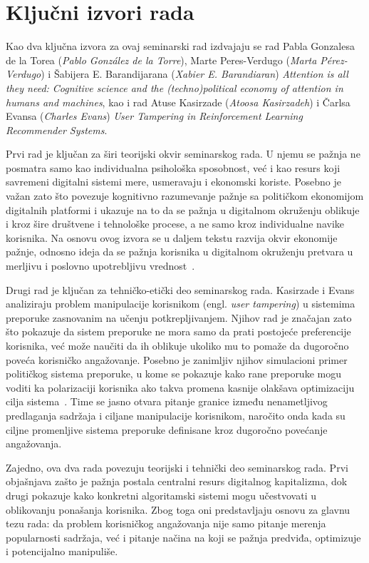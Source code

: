 \section{Ključni izvori rada}

Kao dva ključna izvora za ovaj seminarski rad izdvajaju se rad Pabla Gonzalesa de la Torea (\textit{Pablo González de la Torre}), Marte Peres-Verdugo (\textit{Marta Pérez-Verdugo}) i Šabijera E. Barandijarana (\textit{Xabier E. Barandiaran}) \textit{Attention is all they need: Cognitive science and the (techno)political economy of attention in humans and machines}, kao i rad Atuse Kasirzade (\textit{Atoosa Kasirzadeh}) i Čarlsa Evansa (\textit{Charles Evans}) \textit{User Tampering in Reinforcement Learning Recommender Systems}.

Prvi rad je ključan za širi teorijski okvir seminarskog rada. U njemu se pažnja ne posmatra samo kao individualna psihološka sposobnost, već i kao resurs koji savremeni digitalni sistemi mere, usmeravaju i ekonomski koriste. Posebno je važan zato što povezuje kognitivno razumevanje pažnje sa političkom ekonomijom digitalnih platformi i ukazuje na to da se pažnja u digitalnom okruženju oblikuje i kroz šire društvene i tehnološke procese, a ne samo kroz individualne navike korisnika. Na osnovu ovog izvora se u daljem tekstu razvija okvir ekonomije pažnje, odnosno ideja da se pažnja korisnika u digitalnom okruženju pretvara u merljivu i poslovno upotrebljivu vrednost~\cite{gonzalez2024attention}.

Drugi rad je ključan za tehničko-etički deo seminarskog rada. Kasirzade i Evans analiziraju problem manipulacije korisnikom (engl. \textit{user tampering}) u sistemima preporuke zasnovanim na učenju potkrepljivanjem. Njihov rad je značajan zato što pokazuje da sistem preporuke ne mora samo da prati postojeće preferencije korisnika, već može naučiti da ih oblikuje ukoliko mu to pomaže da dugoročno poveća korisničko angažovanje. Posebno je zanimljiv njihov simulacioni primer političkog sistema preporuke, u kome se pokazuje kako rane preporuke mogu voditi ka polarizaciji korisnika ako takva promena kasnije olakšava optimizaciju cilja sistema~\cite{kasirzadeh2021user}. Time se jasno otvara pitanje granice između nenametljivog predlaganja sadržaja i ciljane manipulacije korisnikom, naročito onda kada su ciljne promenljive sistema preporuke definisane kroz dugoročno povećanje angažovanja.

Zajedno, ova dva rada povezuju teorijski i tehnički deo seminarskog rada. Prvi objašnjava zašto je pažnja postala centralni resurs digitalnog kapitalizma, dok drugi pokazuje kako konkretni algoritamski sistemi mogu učestvovati u oblikovanju ponašanja korisnika. Zbog toga oni predstavljaju osnovu za glavnu tezu rada: da problem korisničkog angažovanja nije samo pitanje merenja popularnosti sadržaja, već i pitanje načina na koji se pažnja predviđa, optimizuje i potencijalno manipuliše.
